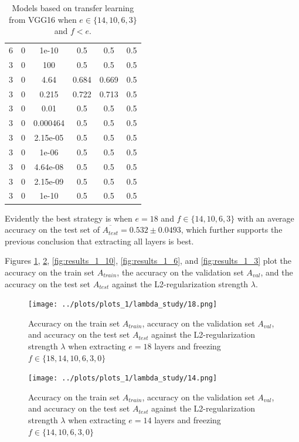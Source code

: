 \begin{itemize}
\begin{table}[ht]
\begin{tabular}{ |c|c|c|c|c|c| }
        6 & 0 & 1e-10 & 0.5 & 0.5 & 0.5 \\
        3 & 0 & 100 & 0.5 & 0.5 & 0.5 \\
        3 & 0 & 4.64 & 0.684 & 0.669 & 0.5 \\
        3 & 0 & 0.215 & 0.722 & 0.713 & 0.5 \\
        3 & 0 & 0.01 & 0.5 & 0.5 & 0.5 \\
        3 & 0 & 0.000464 & 0.5 & 0.5 & 0.5 \\
        3 & 0 & 2.15e-05 & 0.5 & 0.5 & 0.5 \\
        3 & 0 & 1e-06 & 0.5 & 0.5 & 0.5 \\
        3 & 0 & 4.64e-08 & 0.5 & 0.5 & 0.5 \\
        3 & 0 & 2.15e-09 & 0.5 & 0.5 & 0.5 \\
        3 & 0 & 1e-10 & 0.5 & 0.5 & 0.5 \\
        \hline
        \end{tabular}
        \caption{Models based on transfer learning from VGG16 when $e \in \{14,10,6,3\}$ and $f < e$.}
        \label{table:partial_feature_extraction_partial_fine_tuning}
        \end{table}

\end{itemize}

Evidently the best strategy is when $e = 18$ and $f \in \{14,10,6,3\}$ with an average accuracy on the test set of $\overline{A_{test}} = 0.532 \pm 0.0493$, which further supports the previous conclusion that extracting all layers is best.

Figures \ref{fig:results_1_18}, \ref{fig:results_1_14}, \ref{fig:results_1_10}, \ref{fig:results_1_6}, and \ref{fig:results_1_3} plot the accuracy on the train set $A_{train}$, the accuracy on the validation set $A_{val}$, and the accuracy on the test set $A_{test}$ against the L2-regularization strength $\lambda$.

\begin{figure}[ht]
    \centering
    \texttt{[image: ../plots/plots\_1/lambda\_study/18.png]}
    \caption{Accuracy on the train set $A_{train}$, accuracy on the validation set $A_{val}$, and accuracy on the test set $A_{test}$ against the L2-regularization strength $\lambda$ when extracting $e = 18$ layers and freezing $f \in \{18, 14, 10, 6, 3, 0\}$}
    \label{fig:results_1_18}
\end{figure}

\begin{figure}[ht]
    \centering
    \texttt{[image: ../plots/plots\_1/lambda\_study/14.png]}
    \caption{Accuracy on the train set $A_{train}$, accuracy on the validation set $A_{val}$, and accuracy on the test set $A_{test}$ against the L2-regularization strength $\lambda$ when extracting $e = 14$ layers and freezing $f \in \{14, 10, 6, 3, 0\}$}
    \label{fig:results_1_14}
\end{figure}


